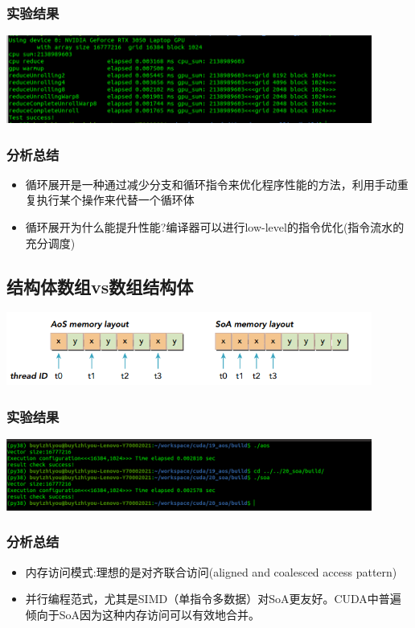 \subsubsection{实验结果}
\noindent
\includegraphics[width=0.9\textwidth]{assets/loop.png}
\subsubsection{分析总结}
\noindent
\begin{itemize}
	\item 循环展开是一种通过减少分支和循环指令来优化程序性能的方法，利用手动重复执行某个操作来代替一个循环体
	\item 循环展开为什么能提升性能?编译器可以进行low-level的指令优化(指令流水的充分调度)
\end{itemize}


\subsection{结构体数组vs数组结构体}
\includegraphics[width=0.9\textwidth]{assets/sc.png}
\subsubsection{实验结果}
\noindent
\includegraphics[width=0.9\textwidth]{assets/aos.png}
\subsubsection{分析总结}
\noindent
\begin{itemize}
	\item 内存访问模式:理想的是对齐联合访问(aligned and coalesced access pattern)
	\item 并行编程范式，尤其是SIMD（单指令多数据）对SoA更友好。CUDA中普遍倾向于SoA因为这种内存访问可以有效地合并。
\end{itemize}


